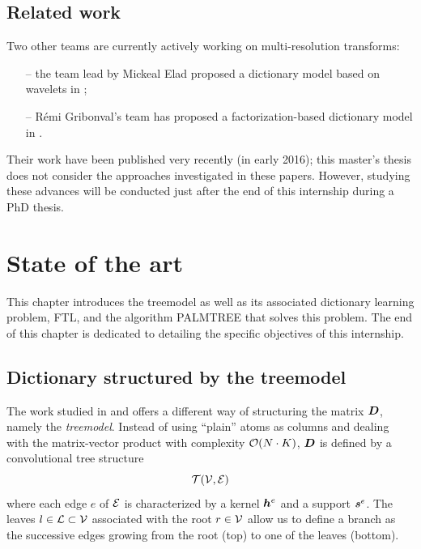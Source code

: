 \section{Related work}
Two other teams are currently actively working on multi-resolution transforms:
\begin{itemize}
	\item[--] the team lead by Mickeal Elad proposed a dictionary model based on wavelets in \cite{sulam_trainlets:_2016};
	\item[--] Rémi Gribonval’s team has proposed a factorization-based dictionary model in  \cite{le_magoarou_flexible_2016}.
\end{itemize}
Their work have been published very recently (in early 2016); this master's thesis does not consider the approaches investigated in these papers. However, studying these advances will be conducted just after the end of this internship during a PhD thesis.


\chapter{State of the art}
This chapter introduces the \Gls{treemodel} as well as its associated dictionary learning problem, \acs{FTL}, and the algorithm \ac{PALMTREE} that solves this problem. The end of this chapter is dedicated to detailing the specific objectives of this internship.

\section{Dictionary structured by the \Gls{treemodel}}\label{sec_tree_model}
The work studied in \cite{chabiron_toward_2015} and \cite{chabiron_optimization_2016} offers a different way of structuring the matrix $\bm{D}$, namely the \emph{\Gls{treemodel}}. Instead of using “plain” atoms as columns and dealing with the matrix-vector product with complexity $\mathcal{O}(N \cdot K)$, $\bm{D}$ is defined by a convolutional tree structure \begin{equation*}\mathcal T(\mathcal V,\mathcal E)\end{equation*} where each edge $e$ of $\mathcal E$ is characterized by a kernel $\bm{h}^e$ and a support $\bm{s}^e$. The leaves $l \in \mathcal L \subset \mathcal V$ associated with the root $r \in \mathcal V$ allow us to define a branch as the successive edges growing from the root (top) to one of the leaves (bottom).

